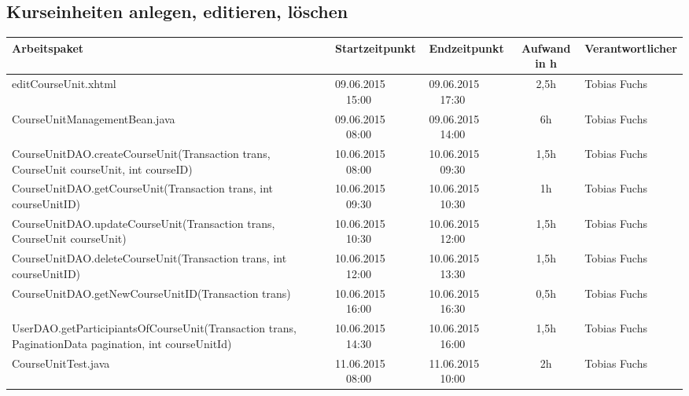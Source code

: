 \begin{landscape}
	\subsection{Kurseinheiten anlegen, editieren, löschen}
	\begin{tabular}{|p{10.3cm}|p{3.2cm}|p{3.2cm}|c|p{3.5cm}|}
		\hline  \textbf{Arbeitspaket} & \textbf{Startzeitpunkt} & \textbf{Endzeitpunkt} & \textbf{Aufwand in h} & \textbf{Verantwortlicher} \\ 
		\hline   editCourseUnit.xhtml                                       & 09.06.2015 \ \ 15:00       & 09.06.2015  \ \  17:30      &  2,5h                & Tobias Fuchs\\
		\hline   CourseUnitManagementBean.java                              & 09.06.2015 \ \ 08:00       & 09.06.2015  \ \  14:00      &  6h                & Tobias Fuchs\\
		\hline   CourseUnitDAO.createCourseUnit(Transaction trans, CourseUnit courseUnit, int courseID)  & 10.06.2015 \ \ 08:00       & 10.06.2015  \ \  09:30      &  1,5h                & Tobias Fuchs\\ 
		\hline   CourseUnitDAO.getCourseUnit(Transaction trans, int courseUnitID)                        & 10.06.2015 \ \ 09:30       & 10.06.2015  \ \  10:30      &  1h                & Tobias Fuchs\\ 
		\hline   CourseUnitDAO.updateCourseUnit(Transaction trans, CourseUnit courseUnit)                & 10.06.2015 \ \ 10:30       & 10.06.2015  \ \  12:00      &   1,5h                & Tobias Fuchs\\ 
		\hline   CourseUnitDAO.deleteCourseUnit(Transaction trans, int courseUnitID)                     & 10.06.2015 \ \ 12:00       & 10.06.2015  \ \  13:30      &   1,5h                & Tobias Fuchs\\
		\hline   CourseUnitDAO.getNewCourseUnitID(Transaction trans)        & 10.06.2015 \ \ 16:00       & 10.06.2015  \ \ 16:30      &  0,5h              & Tobias Fuchs\\
		\hline   UserDAO.getParticipiantsOfCourseUnit(Transaction trans, PaginationData pagination, int courseUnitId)& 10.06.2015 \ \ 14:30       & 10.06.2015  \ \  16:00      &   1,5h                & Tobias Fuchs\\
		\hline   CourseUnitTest.java& 11.06.2015 \ \ 08:00       & 11.06.2015  \ \  10:00      &   2h                & Tobias Fuchs\\
		\hline 
	\end{tabular} \ \\
	\ \\
	
\end{landscape}




